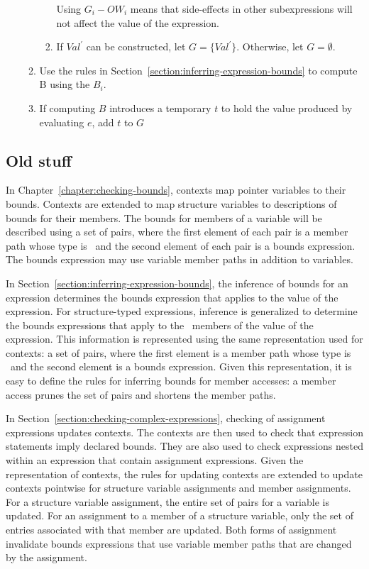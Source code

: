 \begin{enumerate}
\begin{enumerate}
\begin{enumerate}
      Using $G_i - {OW}_i$ means that side-effects in other subexpressions will not affect
      the value of the expression.
\item If $Val^\prime$ can be constructed, let $G = \{ Val^\prime \}$.  Otherwise, let $G = \emptyset$.	
\end{enumerate}
\item Use the rules in Section~\ref{section:inferring-expression-bounds} to compute B using the $B_i$. 
\item If computing $B$ introduces a temporary $t$ to hold the value produced by evaluating $e$, add $t$ to $G$

\end{enumerate}
\end{enumerate}

\subsection{Old stuff}

In Chapter~\ref{chapter:checking-bounds}, contexts map pointer variables to their bounds.
Contexts are extended to map structure variables to descriptions of bounds for their
members.  The bounds for members of a variable will be described using a set of pairs,
where the first element of each pair is a member path whose type is \arrayptr\
and the second element of each pair is a bounds expression.  The bounds expression may use 
variable member paths in addition to variables.

In Section~\ref{section:inferring-expression-bounds}, the inference of bounds for an
expression determines the bounds expression that applies to the value of the
expression.  For structure-typed expressions, inference is generalized to determine
the bounds expressions that apply to the \arrayptr\ members of the value 
of the expression.  This information is represented using the same
representation used for contexts: a set of pairs, where the first element 
is a member path whose type is \arrayptr\ and the second element is a 
bounds expression.  Given this representation, it is easy to define
the rules for inferring bounds for member accesses: a member access prunes the
set of pairs and shortens the member paths.

In Section~\ref{section:checking-complex-expressions}, checking of assignment
expressions updates contexts.  The contexts are then used to check that expression
statements imply declared bounds.  They are also used to check expressions nested
within an expression that contain assignment expressions. 
Given the representation of contexts, the rules for updating contexts
are extended to update contexts pointwise for structure variable assignments and member 
assignments.  For a structure variable assignment, the entire set of pairs for a
variable is updated.  For an assignment to a member of a  structure variable,
only the set of entries  associated with that member are updated.  Both forms of assignment
invalidate bounds expressions that use variable member paths that are changed by the
assignment.

